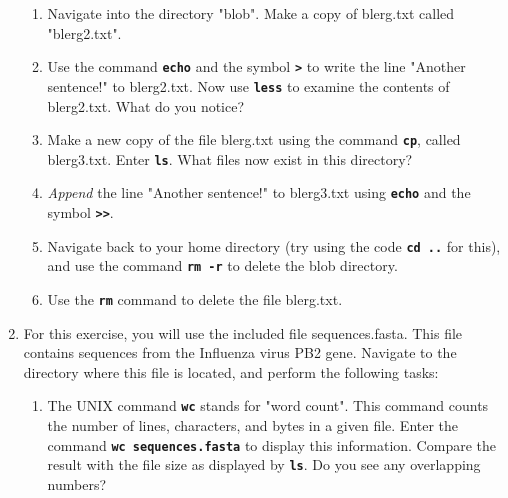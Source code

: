 \documentclass{article}[12pt]
\newcommand{\code}[1]{\textbf{\texttt{#1}}}
\begin{document}
\begin{enumerate}[itemsep=5ex]
\begin{enumerate}[itemsep=2ex]
		\item Navigate into the directory "blob". Make a copy of blerg.txt called "blerg2.txt".
		
		\item Use the command \code{echo} and the symbol \code{>} to write the line "Another sentence!" to blerg2.txt. Now use \code{less} to examine the contents of blerg2.txt. What do you notice?
		
		\item Make a new copy of the file blerg.txt using the command \code{cp}, called blerg3.txt. Enter \code{ls}. What files now exist in this directory?
		
		\item \emph{Append} the line "Another sentence!" to blerg3.txt using \code{echo} and the symbol \code{>>}. 
		
		\item Navigate back to your home directory (try using the code \code{cd ..} for this), and use the command \code{rm -r} to delete the blob directory.	
	
		\item Use the \code{rm} command to delete the file blerg.txt.
	\end{enumerate} 
	
%			
%			
	
	
	\item For this exercise, you will use the included file sequences.fasta. This file contains sequences from the Influenza virus PB2 gene. Navigate to the directory where this file is located, and perform the following tasks:
	\begin{enumerate}[itemsep=2ex]
		\item The UNIX command \code{wc} stands for "word count". This command counts the number of lines, characters, and bytes in a given file. Enter the command \code{wc sequences.fasta} to display this information. Compare the result with the file size as displayed by \code{ls}. Do you see any overlapping numbers?
		

\end{enumerate}
\end{enumerate}
\end{document}
